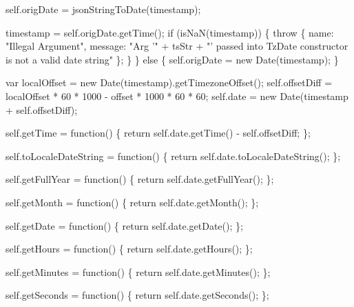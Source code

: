 \begin{DoxyCodeInclude}
    \textcolor{keyword}{self}.origDate = jsonStringToDate(timestamp);

    timestamp = \textcolor{keyword}{self}.origDate.getTime();
    \textcolor{keywordflow}{if} (isNaN(timestamp)) \{
      \textcolor{keywordflow}{throw} \{
        name: \textcolor{stringliteral}{"Illegal Argument"},
        message: \textcolor{stringliteral}{"Arg '"} + tsStr + \textcolor{stringliteral}{"' passed into TzDate constructor is not a valid date string"}
      \};
    \}
  \} \textcolor{keywordflow}{else} \{
    \textcolor{keyword}{self}.origDate = \textcolor{keyword}{new} Date(timestamp);
  \}

  var localOffset = \textcolor{keyword}{new} Date(timestamp).getTimezoneOffset();
  \textcolor{keyword}{self}.offsetDiff = localOffset * 60 * 1000 - offset * 1000 * 60 * 60;
  \textcolor{keyword}{self}.date = \textcolor{keyword}{new} Date(timestamp + \textcolor{keyword}{self}.offsetDiff);

  \textcolor{keyword}{self}.getTime = \textcolor{keyword}{function}() \{
    \textcolor{keywordflow}{return} \textcolor{keyword}{self}.date.getTime() - \textcolor{keyword}{self}.offsetDiff;
  \};

  \textcolor{keyword}{self}.toLocaleDateString = \textcolor{keyword}{function}() \{
    \textcolor{keywordflow}{return} \textcolor{keyword}{self}.date.toLocaleDateString();
  \};

  \textcolor{keyword}{self}.getFullYear = \textcolor{keyword}{function}() \{
    \textcolor{keywordflow}{return} \textcolor{keyword}{self}.date.getFullYear();
  \};

  \textcolor{keyword}{self}.getMonth = \textcolor{keyword}{function}() \{
    \textcolor{keywordflow}{return} \textcolor{keyword}{self}.date.getMonth();
  \};

  \textcolor{keyword}{self}.getDate = \textcolor{keyword}{function}() \{
    \textcolor{keywordflow}{return} \textcolor{keyword}{self}.date.getDate();
  \};

  \textcolor{keyword}{self}.getHours = \textcolor{keyword}{function}() \{
    \textcolor{keywordflow}{return} \textcolor{keyword}{self}.date.getHours();
  \};

  \textcolor{keyword}{self}.getMinutes = \textcolor{keyword}{function}() \{
    \textcolor{keywordflow}{return} \textcolor{keyword}{self}.date.getMinutes();
  \};

  \textcolor{keyword}{self}.getSeconds = \textcolor{keyword}{function}() \{
    \textcolor{keywordflow}{return} \textcolor{keyword}{self}.date.getSeconds();
  \};


\end{DoxyCodeInclude}
